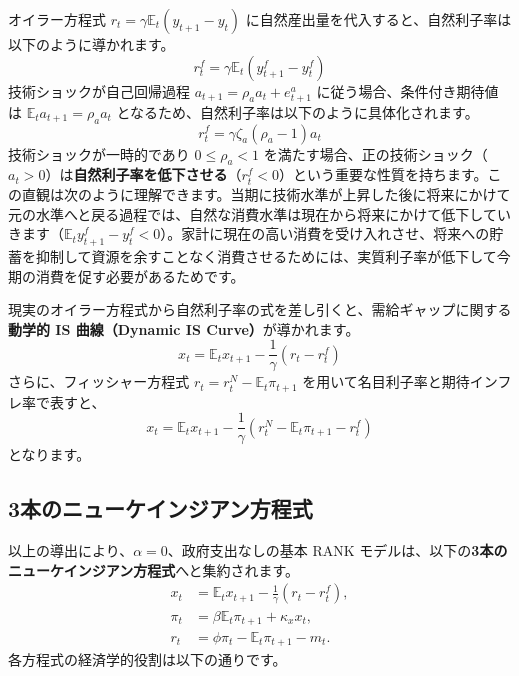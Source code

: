 \documentclass[
  japanese,
  lualatex,
  ja=standard,
  12pt,
  a4paper]{ltjsarticle}
\begin{document}
オイラー方程式 \(r_t=\gamma\mathbb{E}_t(y_{t+1}-y_t)\)
に自然産出量を代入すると、自然利子率は以下のように導かれます。 \[
r_t^f
=
\gamma\mathbb{E}_t(y_{t+1}^f-y_t^f)
\] 技術ショックが自己回帰過程 \(a_{t+1}=\rho_a a_t+e_{t+1}^a\)
に従う場合、条件付き期待値は \(\mathbb{E}_t a_{t+1}=\rho_a a_t\)
となるため、自然利子率は以下のように具体化されます。 \[
r_t^f
=
\gamma\zeta_a(\rho_a-1)a_t
\] 技術ショックが一時的であり \(0\leq\rho_a<1\)
を満たす場合、正の技術ショック（\(a_t>0\)）は\textbf{自然利子率を低下させる}（\(r_t^f<0\)）という重要な性質を持ちます。この直観は次のように理解できます。当期に技術水準が上昇した後に将来にかけて元の水準へと戻る過程では、自然な消費水準は現在から将来にかけて低下していきます（\(\mathbb{E}_t y_{t+1}^f - y_t^f < 0\)）。家計に現在の高い消費を受け入れさせ、将来への貯蓄を抑制して資源を余すことなく消費させるためには、実質利子率が低下して今期の消費を促す必要があるためです。

現実のオイラー方程式から自然利子率の式を差し引くと、需給ギャップに関する\textbf{動学的
IS 曲線（Dynamic IS Curve）}が導かれます。 \[
x_t=\mathbb{E}_t x_{t+1}
-\frac{1}{\gamma}\left(r_t-r_t^f\right)
\] さらに、フィッシャー方程式 \(r_t=r_t^N-\mathbb{E}_t\pi_{t+1}\)
を用いて名目利子率と期待インフレ率で表すと、 \[
x_t=\mathbb{E}_t x_{t+1}
-\frac{1}{\gamma}
\left(r_t^N-\mathbb{E}_t\pi_{t+1}-r_t^f\right)
\] となります。

\Needspace{0.50\textheight}

\subsection{3本のニューケインジアン方程式}\label{ux672cux306eux30cbux30e5ux30fcux30b1ux30a4ux30f3ux30b8ux30a2ux30f3ux65b9ux7a0bux5f0f}

以上の導出により、\(\alpha=0\)、政府支出なしの基本 RANK
モデルは、以下の\textbf{3本のニューケインジアン方程式}へと集約されます。
\[
\begin{aligned}
x_t
&=
\mathbb{E}_t x_{t+1}
-\frac{1}{\gamma}(r_t-r_t^f),\\
\pi_t
&=
\beta\mathbb{E}_t\pi_{t+1}
+\kappa_x x_t,\\
r_t
&=
\phi\pi_t-\mathbb{E}_t\pi_{t+1}-m_t.
\end{aligned}
\] 各方程式の経済学的役割は以下の通りです。
\end{document}
